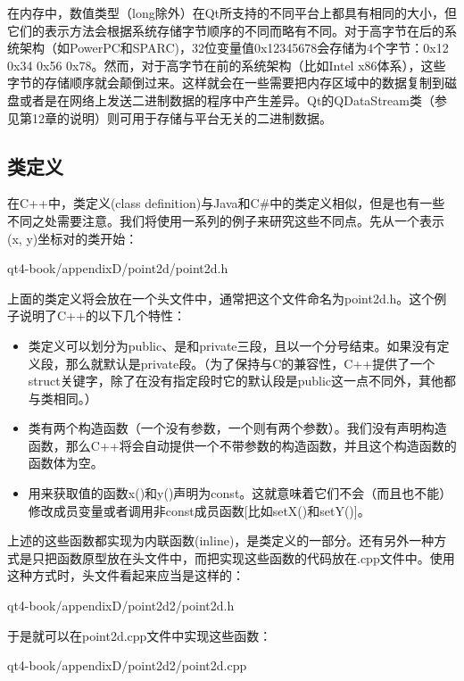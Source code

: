 \documentclass[11pt,oneside]{book}
\begin{document}
\begin{common-format}
在内存中，数值类型（long除外）在Qt所支持的不同平台上都具有相同的大小，但它们的表示方法会根据系统存储字节顺序的不同而略有不同。对于高字节在后的系统架构（如PowerPC和SPARC)，32位变量值0x12345678会存储为4个字节：0x12 0x34 0x56 0x78。然而，对于高字节在前的系统架构（比如Intel x86体系），这些字节的存储顺序就会颠倒过来。这样就会在一些需要把内存区域中的数据复制到磁盘或者是在网络上发送二进制数据的程序中产生差异。Qt的QDataStream类（参见第12章的说明）则可用于存储与平台无关的二进制数据。

\subsection{类定义}
在C++中，类定义(class definition)与Java和C\#{}中的类定义相似，但是也有一些不同之处需要注意。我们将使用一系列的例子来研究这些不同点。先从一个表示(x, y)坐标对的类开始：

\begin{cppinput}{qt4-book/appendixD/point2d/point2d.h}
\end{cppinput}

上面的类定义将会放在一个头文件中，通常把这个文件命名为point2d.h。这个例子说明了C++的以下几个特性：
\begin{itemize}
\item 类定义可以划分为public、是和private三段，且以一个分号结束。如果没有定义段，那么就默认是private段。（为了保持与C的兼容性，C++提供了一个struct关键字，除了在没有指定段时它的默认段是public这一点不同外，萁他都与类相同。）
\item 类有两个构造函数（一个没有参数，一个则有两个参数）。我们没有声明构造函数，那么C++将会自动提供一个不带参数的构造函数，并且这个构造函数的函数体为空。
\item 用来获取值的函数x()和y()声明为const。这就意味着它们不会（而且也不能）修改成员变量或者调用非const成员函数[比如setX()和setY()]。
\end{itemize}

上述的这些函数都实现为内联函数(inline)，是类定义的一部分。还有另外一种方式是只把函数原型放在头文件中，而把实现这些函数的代码放在.cpp文件中。使用这种方式时，头文件看起来应当是这样的：

\begin{cppinput}{qt4-book/appendixD/point2d2/point2d.h}
\end{cppinput}

于是就可以在point2d.cpp文件中实现这些函数：
\begin{cppinput}{qt4-book/appendixD/point2d2/point2d.cpp}
\end{cppinput}


\end{common-format}
\end{document}
